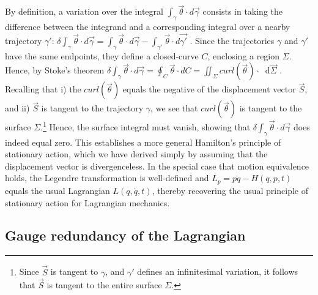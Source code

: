 \documentclass[12pt, english, twoside]{article} %
\newcommand{\diff}{\mathop{}\!\mathrm{d}} %
\renewcommand{\vector}[1]{\ensuremath{\vec{#1}}} %
\newcommand{\integral}{\int}
\begin{document}
By definition, a variation over the integral $\integral_{\gamma} \vector{\theta} \cdot d\vector{\gamma}$ consists in taking the difference between the integrand and a corresponding integral over a nearby trajectory $\gamma'$: $\delta \integral_{\gamma} \vector{\theta} \cdot d\vector{\gamma} = \integral_{\gamma} \vector{\theta} \cdot d\vector{\gamma} - \integral_{\gamma'} \vector{\theta} \cdot d\vector{\gamma'}$ . Since the trajectories $\gamma$ and $\gamma'$ have the same endpoints, they define a closed-curve $C$, enclosing a region $\Sigma $. Hence, by Stoke's theorem $\delta \integral_{\gamma} \vector{\theta} \cdot d\vector{\gamma} = \oint_{C} \vector{\theta}  \cdot dC = \iint_{\Sigma} curl(\vector{\theta}) \cdot \diff \vector{\Sigma}$ . Recalling that i) the $curl(\vector{\theta})$ equals the negative of the displacement vector $\vector{S}$, and ii)  $\vector{S}$ is tangent to the trajectory $\gamma $, we see that $curl(\vector{\theta})$ is tangent to the surface $\Sigma $.\footnote{Since $\vector{S}$ is tangent to $\gamma $, and $\gamma'$ defines an infinitesimal variation, it follows that $\vector{S}$ is tangent to the entire surface $\Sigma $.} Hence, the surface integral must vanish, showing that $\delta \integral_{\gamma} \vector{\theta} \cdot d\vector{\gamma}$ does indeed equal zero. This establishes a more general Hamilton's principle of stationary action, which we have derived simply by assuming that the displacement vector is divergenceless. In the special case that motion equivalence holds, the Legendre transformation is well-defined and $L_p = p \dot{q} - H(q, p, t)$ equals the usual Lagrangian $L(q, \dot{q}, t)$, thereby recovering the usual principle of stationary action for Lagrangian mechanics. 


\subsection{Gauge redundancy of the Lagrangian}
\label{gauge}
\end{document}
